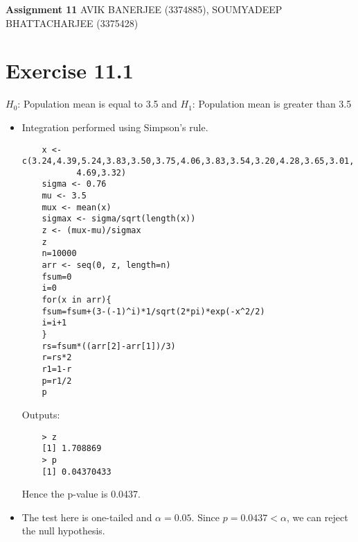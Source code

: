 \documentclass[a4paper]{article}
\begin{document}
	\begin{center}
		\textbf{\LARGE Assignment 11}\linebreak\linebreak
		{\large AVIK BANERJEE (3374885), SOUMYADEEP BHATTACHARJEE (3375428)}
	\end{center}
\section*{Exercise 11.1}
$H_0$: Population mean is equal to 3.5 and $H_1$: Population mean is greater than 3.5
\begin{itemize}
	\item Integration performed using Simpson's rule.
	\begin{verbatim}
	x <- c(3.24,4.39,5.24,3.83,3.50,3.75,4.06,3.83,3.54,3.20,4.28,3.65,3.01,
	       4.69,3.32)
	sigma <- 0.76
	mu <- 3.5
	mux <- mean(x)
	sigmax <- sigma/sqrt(length(x))
	z <- (mux-mu)/sigmax
	z
	n=10000
	arr <- seq(0, z, length=n)
	fsum=0
	i=0
	for(x in arr){
	fsum=fsum+(3-(-1)^i)*1/sqrt(2*pi)*exp(-x^2/2)
	i=i+1
	}
	rs=fsum*((arr[2]-arr[1])/3)
	r=rs*2
	r1=1-r
	p=r1/2
	p
	\end{verbatim}
	Outputs:
	\begin{verbatim}
	> z
	[1] 1.708869
	> p
	[1] 0.04370433
	\end{verbatim}
	Hence the p-value is 0.0437.
	\item The test here is one-tailed and $\alpha=0.05$. Since $p=0.0437<\alpha$, we can reject the null hypothesis.
\end{itemize}
\end{document}
